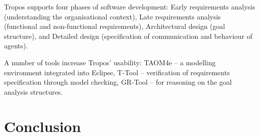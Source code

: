 \documentclass{article}
\begin{document}
Tropos supports four phases of software development: Early requirements analysis (understanding the organisational context), Late requirements analysis (functional and non-functional requirements), Architectural design (goal structure), and Detailed design (specification of communication and behaviour of agents). 

A number of tools increase Tropos' usability: TAOM4e -- a modelling environment integrated into Eclipse, T-Tool -- verification of requirements specification through model checking, GR-Tool -- for reasoning on the goal analysis structures.

\section{Conclusion}



\end{document}
